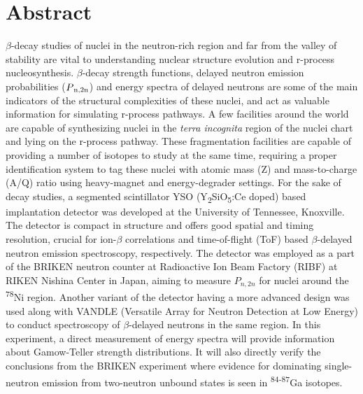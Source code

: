 \chapter*{Abstract}\label{ch:abstract}
 $\beta$-decay studies of nuclei in the neutron-rich region and far from the valley of stability are vital to understanding nuclear structure evolution and r-process nucleosynthesis. $\beta$-decay strength functions, delayed neutron emission probabilities ($P\textsubscript{n,2n}$) and energy spectra of delayed neutrons are some of the main indicators of the structural complexities of these nuclei, and act as valuable information for simulating r-process pathways. A few facilities around the world are capable of synthesizing nuclei in the \textit{terra incognita} region of the nuclei chart and lying on the r-process pathway. These fragmentation facilities are capable of providing a number of isotopes to study at the same time, requiring a proper identification system to tag these nuclei with atomic mass (Z) and mass-to-charge (A/Q) ratio using heavy-magnet and energy-degrader settings. For the sake of decay studies, a segmented scintillator YSO (Y\textsubscript{2}SiO\textsubscript{5}:Ce doped) based implantation detector was developed at the University of Tennessee, Knoxville. The detector is compact in structure and offers good spatial and timing resolution, crucial for ion-$\beta$ correlations and time-of-flight (ToF) based $\beta$-delayed neutron emission spectroscopy, respectively. The detector was employed as a part of the BRIKEN neutron counter at Radioactive Ion Beam Factory (RIBF) at RIKEN Nishina Center in Japan, aiming to measure $P_{n,2n}$ for nuclei around the {\textsuperscript{78}Ni} region. Another variant of the detector having a more advanced design was used along with VANDLE (Versatile Array for Neutron Detection at Low Energy) to conduct spectroscopy of $\beta$-delayed neutrons in the same region. In this experiment, a direct measurement of energy spectra will provide information about Gamow-Teller strength distributions. It will also directly verify the conclusions from the BRIKEN experiment where evidence for dominating single-neutron emission from two-neutron unbound states is seen in \textsuperscript{84-87}Ga isotopes.